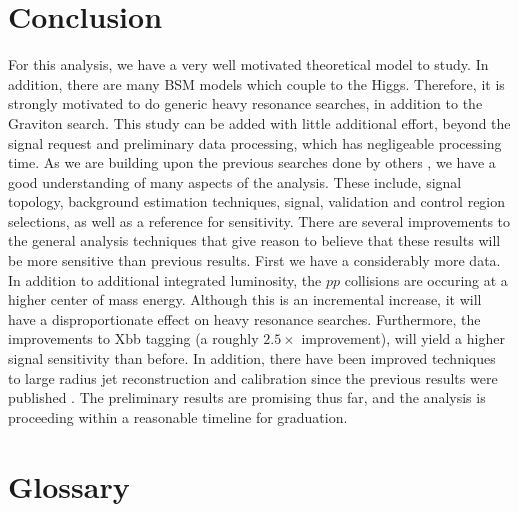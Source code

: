 \documentclass[12pt]{article}
\newcommand{\term}[2]{\textbf{#1}: #2}
\newcommand{\acronym}[2]{\textbf{#1} -- #2}
\begin{document}
\section{Conclusion}
For this analysis, we have a very well motivated theoretical model to study. In
addition, there are many BSM models which couple to the Higgs. Therefore, it is
strongly motivated to do generic heavy resonance searches, in addition to the
Graviton search. This study can be added with little additional effort, beyond
the signal request and preliminary data processing, which has negligeable
processing time. As we are building upon the previous searches done by others
\cite{previous_results}, we have a good understanding of many aspects of the
analysis. These include, signal topology, background estimation techniques,
signal, validation and control region selections, as well as a reference for
sensitivity. There are several improvements to the general analysis techniques
that give reason to believe that these results will be more sensitive than
previous results. First we have a considerably more data. In addition to
additional integrated luminosity, the $pp$ collisions are occuring at a higher
center of mass energy. Although this is an incremental increase, it will have a
disproportionate effect on heavy resonance searches. Furthermore, the
improvements to Xbb tagging (a roughly $2.5\times$ improvement), will yield a
higher signal sensitivity than before. In addition, there have been improved
techniques to large radius jet reconstruction and calibration since the previous
results were published \cite{large_r_jet}. The preliminary results are promising
thus far, and the analysis is proceeding within a reasonable timeline for
graduation.

\clearpage
\newpage
\section{Glossary}



%
%
\end{document}
